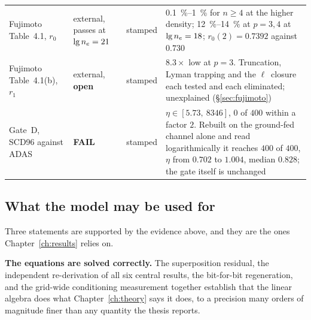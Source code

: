 \begin{table}[tbp]
\begin{tabular}{p{3.9cm}p{1.8cm}p{1.3cm}p{5.6cm}}
Fujimoto Table~4.1, $r_0$ & external, passes at $\lg n_e = 21$ & stamped & \SIrange{0.1}{1}{\percent} for $n\ge4$ at the higher density; \SIrange{12}{14}{\percent} at $p=3,4$ at $\lg n_e = 18$; $r_0(2) = 0.7392$ against $0.730$ \\
Fujimoto Table~4.1(b), $r_1$ & external, \textbf{open} & stamped & $8.3\times$ low at $p=3$. Truncation, Lyman trapping and the $\ell$~closure each tested and each eliminated; unexplained (\S\ref{sec:fujimoto}) \\
Gate~D, SCD96 against ADAS & \textbf{FAIL} & stamped & $\eta \in [5.73,\ 8346]$, $0$ of $400$ within a factor $2$. Rebuilt on the ground-fed channel alone and read logarithmically it reaches $400$ of $400$, $\eta$ from $0.702$ to $1.004$, median $0.828$; the gate itself is unchanged \\
\bottomrule
\end{tabular}
\end{table}

\subsection{What the model may be used for}

Three statements are supported by the evidence above, and they are the ones
Chapter~\ref{ch:results} relies on.

\textbf{The equations are solved correctly.} The superposition residual, the
independent re-derivation of all six central results, the bit-for-bit
regeneration, and the grid-wide conditioning measurement together establish that
the linear algebra does what Chapter~\ref{ch:theory} says it does, to a
precision many orders of magnitude finer than any quantity the thesis reports.

